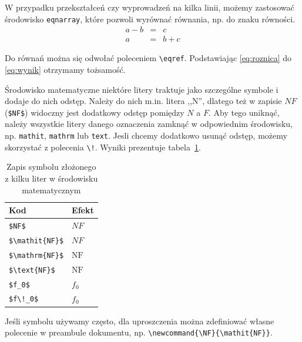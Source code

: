 W przypadku przekształceń czy wyprowadzeń na kilka linii, możemy zastosować środowisko \texttt{eqnarray}, które pozwoli wyrównać równania, np. do znaku równości.
%
\begin{eqnarray}
    a - b &=& c\label{eq:roznica}\\
    a &=& b + c\label{eq:wynik}
\end{eqnarray}

Do równań można się odwołać poleceniem \texttt{\textbackslash eqref}. Podstawiając \eqref{eq:roznica} do \eqref{eq:wynik} otrzymamy tożsamość.

Środowisko matematyczne niektóre litery traktuje jako szczególne symbole i dodaje do nich odstęp. Należy do nich m.in. litera ,,N'', dlatego też w zapisie $NF$ (\texttt{\$NF\$}) widoczny jest dodatkowy odstęp pomiędzy $N$ a $F$. Aby tego uniknąć, należy wszystkie litery danego oznaczenia zamknąć w odpowiednim środowisku, np. \texttt{mathit}, \texttt{mathrm} lub \texttt{text}. Jesli chcemy dodatkowo usunąć odstęp, możemy skorzystać z polecenia \texttt{\textbackslash !}. Wyniki prezentuje tabela~\ref{tab:math_acronym}.

\begin{table}
    \centering
    \caption{Zapis symbolu złożonego z kilku liter w środowisku matematycznym}
    \label{tab:math_acronym}
	\begin{tabular}{ll}
        \toprule
        Kod & Efekt \\
        \midrule
		\texttt{\$NF\$} & $NF$ \\
		\texttt{\$\textbackslash mathit\{NF\}\$} & $\mathit{NF}$ \\
		\texttt{\$\textbackslash mathrm\{NF\}\$} & $\mathrm{NF}$ \\
		\texttt{\$\textbackslash text\{NF\}\$}   & $\text{NF}$ \\
        \texttt{\$f\_0\$} & $f_0$ \\
		\texttt{\$f\textbackslash!\_0\$} & $f\!_0$ \\
        \bottomrule
	\end{tabular}
\end{table}

Jeśli symbolu używamy często, dla uproszczenia można zdefiniować własne polecenie w preambule dokumentu, np. \texttt{\textbackslash newcommand\{\textbackslash NF\}\{\textbackslash mathit\{NF\}\}}.

